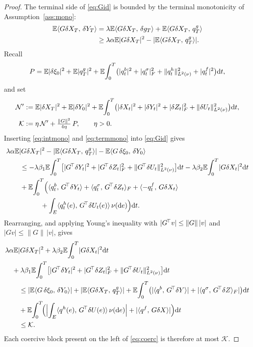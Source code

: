 \begin{proof}
The terminal side of \eqref{eq:Gid} is bounded by the terminal monotonicity of
Assumption~\ref{ass:mono}:
\begin{equation}\label{eq:termmono}
\begin{aligned}
\mathbb{E}\langle G\delta X_T,\,\delta Y_T\rangle
&=\lambda\mathbb{E}\langle G\delta X_T,\,\delta g_T\rangle+\mathbb{E}\langle G\delta X_T,\,q^g_T\rangle\\
&\ge\lambda\alpha\mathbb{E}|G\delta X_T|^2-|\mathbb{E}\langle G\delta X_T,\,q^g_T\rangle| .
\end{aligned}
\end{equation}
Recall
\[
P=\mathbb{E}|\delta\xi_0|^2+\mathbb{E}|q^g_T|^2
+\mathbb{E}\!\int_0^T\!\big(|q^b_t|^2+|q^\sigma_t|_F^2+\lVert q^h_t\rVert_{L^2(\nu)}^2+|q^f_t|^2\big)\mathrm{d} t ,
\]
and set
\[
\begin{aligned}
\mathcal N'&:=\mathbb{E}|\delta X_T|^2+\mathbb{E}|\delta Y_0|^2
+\mathbb{E}\!\int_0^T\!\big(|\delta X_t|^2+|\delta Y_t|^2+|\delta Z_t|_F^2+\lVert \delta U_t\rVert_{L^2(\nu)}^2\big)\mathrm{d} t ,\\
\mathcal K&:=\eta\,\mathcal N'+\tfrac{\|G\|^2}{4\eta}\,P ,\qquad \eta>0 .
\end{aligned}
\]
Inserting \eqref{eq:intmono} and \eqref{eq:termmono} into \eqref{eq:Gid} gives
\[
\begin{aligned}
&\lambda\alpha\E|G\delta X_T|^2-|\E\inner{G\delta X_T}{q^g_T}|-\E\inner{G\,\delta\xi_0}{\delta Y_0}\\
&\qquad\le-\lambda\beta_1\E\!\int_0^T\!\big[|\Gstar\delta Y_t|^2+|\Gstar\delta Z_t|_F^2+\Lnorm{\Gstar\delta U_t}^2\big]\diff t
-\lambda\beta_2\E\!\int_0^T\!|G\delta X_t|^2\diff t\\
&\qquad+\E\!\int_0^T\!\Big(\inner{q^b_t}{\Gstar\delta Y_t}+\inner{q^\sigma_t}{\Gstar\delta Z_t}_F
+\inner{-q^f_t}{G\delta X_t}\\
&\qquad\qquad\quad+\int_E\inner{q^h_t(e)}{\Gstar\delta U_t(e)}\,\nu(\diff e)\Big)\diff t .
\end{aligned}
\]
Rearranging, and applying Young's inequality with $|G^{\!\top} v|\le\|G\|\,|v|$ and
$|Gv|\le\|G\|\,|v|$, gives
\begin{equation}\label{eq:coerc}
\begin{aligned}
&\lambda\alpha\E|G\delta X_T|^2+\lambda\beta_2\E\!\int_0^T\!|G\delta X_t|^2\diff t\\
&\quad+\lambda\beta_1\E\!\int_0^T\!\big[|\Gstar\delta Y_t|^2+|\Gstar\delta Z_t|_F^2+\Lnorm{\Gstar\delta U_t}^2\big]\diff t\\
&\qquad\le|\E\inner{G\,\delta\xi_0}{\delta Y_0}|+|\E\inner{G\delta X_T}{q^g_T}|
+\E\!\int_0^T\!\big(|\inner{q^b}{\Gstar\delta Y}|+|\inner{q^\sigma}{\Gstar\delta Z}_F|\big)\diff t\\
&\qquad+\E\!\int_0^T\!\Bigl(\Bigl|\int_E\inner{q^h(e)}{\Gstar\delta U(e)}\,\nu(\diff e)\Bigr|
+|\inner{q^f}{G\delta X}|\Bigr)\diff t\\
&\qquad\le\mathcal K .
\end{aligned}
\end{equation}
Each coercive block present on the left of \eqref{eq:coerc} is therefore at most
$\mathcal K$.


\end{proof}
